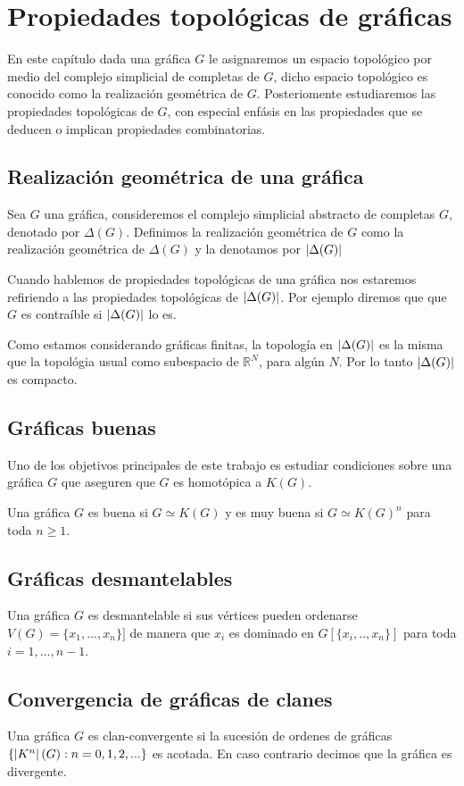 \chapter{Propiedades topológicas de gráficas}
En este capítulo dada una gráfica $G$ le asignaremos un espacio topológico por medio del complejo simplicial de completas de $G$, dicho espacio topológico es conocido como la realización geométrica de $G$.
Posteriomente estudiaremos las propiedades topológicas de $G$, con especial enfásis en las propiedades que se deducen o implican propiedades combinatorias.

\section{Realización geométrica de una gráfica}
\begin{Defi}
Sea $G$ una gráfica, consideremos el complejo simplicial abstracto de completas $G$, denotado por $\Delta(G)$. Definimos la realización geométrica de $G$ como la realización geométrica de $\Delta(G)$ y la denotamos por $\left| \Delta(G) \right|$
\end{Defi}
Cuando hablemos de propiedades topológicas de una gráfica nos estaremos refiriendo a las propiedades topológicas de $\left| \Delta(G) \right|$. Por ejemplo diremos que que $G$ es contraíble si $\left| \Delta(G) \right|$ lo es.

Como estamos considerando gráficas finitas, la topología en $\left| \Delta(G) \right|$ es la misma que la topológia usual como subespacio de $\mathbb{R}^N$, para algún $N$. Por lo tanto $\left| \Delta(G) \right|$ es compacto.

\section{Gráficas buenas}
Uno de los objetivos principales de este trabajo es estudiar condiciones sobre una gráfica $G$ que aseguren que $G$ es homotópica a $K(G)$.
\begin{Defi}
Una gráfica $G$ es buena si $G\simeq K(G)$ y es muy buena si $G\simeq K(G)^n$ para toda $n\geq 1 $.
\end{Defi}

\section{Gráficas desmantelables}
\begin{Defi}
Una gráfica $G$ es desmantelable si sus vértices pueden ordenarse $V(G) = \{x_1,...,x_n\}]$ de manera que $x_i$ es dominado en $G[\{x_i,..,x_n\}]$ para toda $i = 1,...,n-1$.
\end{Defi}

\section{Convergencia de gráficas de clanes}
\begin{Defi}
Una gráfica $G$ es clan-convergente si la sucesión de ordenes de gráficas $\{\left| K^{n} \right|(G): n = 0,1,2,...\}$ es acotada. En caso contrario decimos que la gráfica es divergente.
\end{Defi}




